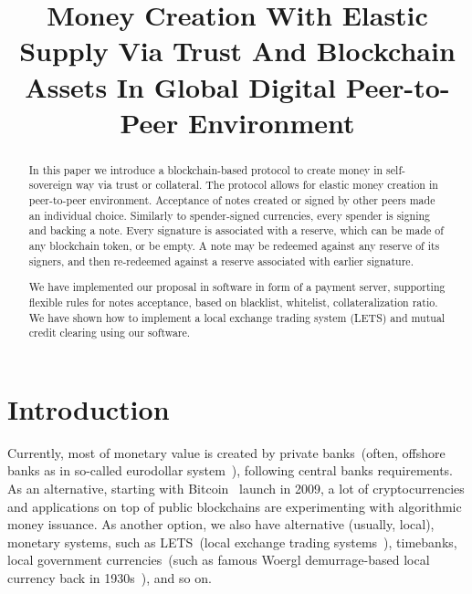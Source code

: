 \documentclass{llncs}   %
\begin{document}
\title{Money Creation With Elastic Supply Via Trust And Blockchain Assets In
Global Digital Peer-to-Peer Environment}



\maketitle

\begin{abstract}
In this paper we introduce a blockchain-based protocol to create money in self-sovereign way via trust or collateral. The
protocol allows for elastic money creation in peer-to-peer environment. Acceptance of notes created or signed
by other peers made an individual choice. Similarly to spender-signed currencies, every spender is signing and backing a
note. Every signature is associated with a reserve, which can be made of any blockchain token, or be empty. A note may
be redeemed against any reserve of its signers, and then re-redeemed against a reserve associated with earlier signature.

We have implemented our proposal in software in form of a payment server, supporting flexible rules for notes acceptance,
based on blacklist, whitelist, collateralization ratio. We have shown how to implement a local exchange trading system (LETS)
and mutual credit clearing using our software.
\end{abstract}

\section{Introduction}

Currently, most of monetary value is created by private banks~(often, offshore banks as in so-called eurodollar
system~\cite{machlup1970euro}), following central banks requirements. As an alternative, starting with
Bitcoin~\cite{nakamoto2008peer} launch in 2009, a lot of cryptocurrencies and applications on top of public
blockchains are experimenting with algorithmic money issuance. As another option, we also have alternative (usually, local),
monetary systems, such as LETS~(local exchange trading systems~\cite{williams1996new}), timebanks, local government
currencies~(such as famous Woergl demurrage-based local currency back in 1930s~\cite{unterguggenbercer1934end}), and so on.
\end{document}
